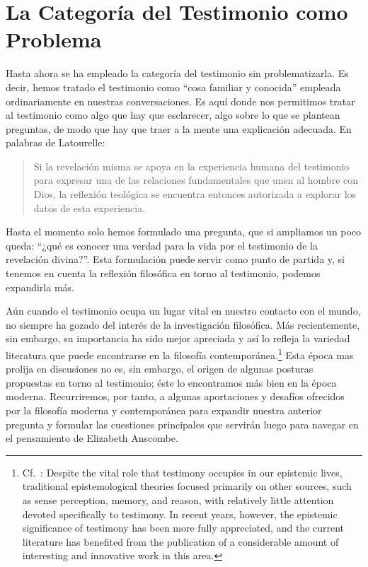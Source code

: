\section{La Categoría del Testimonio como Problema}

Hasta ahora se ha empleado la categoría del testimonio sin problematizarla. Es
decir, hemos tratado el testimonio como \enquote{cosa familiar y conocida}
empleada ordinariamente en nuestras conversaciones. Es aquí donde nos permitimos
tratar al testimonio como algo que hay que esclarecer, algo sobre lo que se
plantean preguntas, de modo que hay que traer a la mente una explicación
adecuada. En palabras de Latourelle:
\blockquote[{\cite[1523]{latourelle2000testimonio}}]{Si la revelación misma se
  apoya en la experiencia humana del testimonio para expresar una de las
  relaciones fundamentales que unen al hombre con Dios, la reflexión teológica
  se encuentra entonces autorizada a explorar los datos de esta experiencia.}

Hasta el momento solo hemos formulado una pregunta, que si ampliamos un poco
queda: \enquote{¿qué es conocer una verdad para la vida por el testimonio de la
  revelación divina?}. Esta formulación puede servir como punto de partida y, si
tenemos en cuenta la reflexión filosófica en torno al testimonio, podemos
expandirla más.

Aún cuando el testimonio ocupa un lugar vital en nuestro contacto con el mundo,
no siempre ha gozado del interés de la investigación filosófica. Más
recientemente, sin embargo, su importancia ha sido mejor apreciada y así lo
refleja la variedad literatura que puede encontrarse en la filosofía
contemporánea.\footnote{Cf.~\cite[1]{lackeysosa2006eptest}: Despite the vital
  role that testimony occupies in our epistemic lives, traditional
  epistemological theories focused primarily on other sources, such as sense
  perception, memory, and reason, with relatively little attention devoted
  specifically to testimony. In recent years, however, the epistemic
  significance of testimony has been more fully appreciated, and the current
  literature has benefited from the publication of a considerable amount of
  interesting and innovative work in this area.}
Esta época mas prolija en discusiones no es, sin embargo, el origen de algunas
posturas propuestas en torno al testimonio; éste lo encontramos más bien en la
época moderna. Recurriremos, por tanto, a algunas aportaciones y desafíos
ofrecidos por la filosofía moderna y contemporánea para expandir nuestra
anterior pregunta y formular las cuestiones principales que servirán luego para
navegar en el pensamiento de Elizabeth Anscombe.

